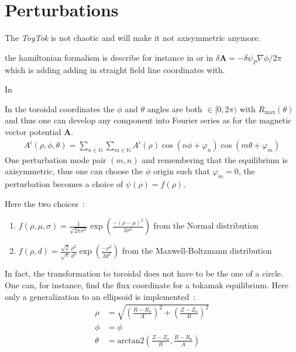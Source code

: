 \section{Perturbations}
The \textit{ToyTok} is not chaotic and will make it not axisymmetric anymore.


the hamiltonian formalism is describe for instance in \cite{viana_hamiltonian_2023} or in
\cite{escande_description_2024} $\delta\textbf{A} = -\delta\psi_P\nabla\phi/2\pi$ which is adding adding in straight field line coordinates with. 

In 

In the toroidal coordinates the $\phi$ and $\theta$ angles are both $\in [0, 2\pi)$ with $R_\text{max}(\theta)$ and thus one can develop any component into Fourier series as for the magnetic vector potential $\textbf{A}$.
\begin{align*}
    A^i(\rho,\phi,\theta) = \sum\limits_{n\in\mathbb{N}}\sum\limits_{m\in\mathbb{N}} A^i(\rho)\cos(n\phi + \varphi_n)\cos(m\theta + \varphi_m)
\end{align*}
One perturbation mode pair $(m,n)$ and remembering that the equilibrium is axisymmetric, thus one can choose the $\phi$ origin such that $\varphi_m = 0$, the perturbation becomes a choice of $\psi(\rho) = f(\rho)$.

Here the two choices~:

\begin{enumerate}
    \item $f(\rho, \mu, \sigma) = \frac{1}{\sqrt{2\pi\sigma^2}}\exp\left(\frac{-(\rho-\mu)^2}{2\sigma^2}\right)$ from the Normal distribution
    
    \item $f(\rho, d) = \frac{\sqrt{2}}{\sqrt{\pi}}\frac{\rho^2}{d^3}\exp\left(\frac{-\rho^2}{2d^2}\right)$ from the Maxwell-Boltzmann distribution
\end{enumerate}

In fact, the transformation to toroidal does not have to be the one of a circle. One can, for instance, find the flux coordinate for a tokamak equilibrium. Here only a generalization to an ellipsoid is implemented~:
\begin{align*}
    \rho &= \sqrt{\left(\frac{R-R_a}{A}\right)^2 + \left(\frac{Z-Z_a}{B}\right)^2}\\
    \phi &= \phi\\
    \theta &= \text{arctan2}(\frac{Z-Z_a}{B}, \frac{R-R_a}{A})\\
\end{align*}

